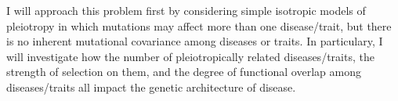 \documentclass[11pt]{article}
\begin{document}
I will approach this problem first by considering simple isotropic models of pleiotropy in which mutations may affect more than one disease/trait, but there is no inherent mutational covariance among diseases or traits. In particulary, I will investigate how the number of pleiotropically related diseases/traits, the strength of selection on them, and the degree of functional overlap among diseases/traits all impact the genetic architecture of disease.

\end{document}
